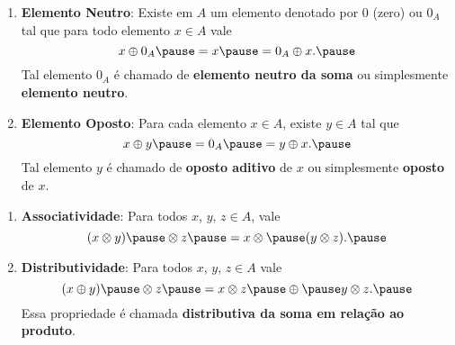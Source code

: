 \documentclass{beamer}
\begin{document}
    \begin{frame}
        \begin{definicao}
            \begin{enumerate}[label={\roman*})]
                \conti

                \item \textbf{Elemento Neutro}: \pause Existe em $A$ \pause um elemento denotado por $0$ \pause (zero)
                    ou $0_{A}$ \pause tal que para todo elemento $x \in A$ \pause vale\pause
                \[
                    x \oplus 0_A \pause = x \pause = 0_A \oplus x.\pause
                \]
                Tal elemento $0_A$ \pause \'e chamado de \textbf{elemento neutro da soma} \pause ou simplesmente
                \textbf{elemento neutro}.\pause

                \vspace{.7cm}

                \item \textbf{Elemento Oposto}: \pause Para cada elemento $x \in A$, \pause existe $y \in A$ \pause tal
                    que\pause
                \[
                    x \oplus y \pause = 0_A \pause = y \oplus x.\pause
                \]
                Tal elemento $y$ \pause \'e chamado de \textbf{oposto aditivo} \pause de $x$ \pause ou simplesmente
                \textbf{oposto} de $x$.

                \vspace{.7cm}

                \seti
            \end{enumerate}
        \end{definicao}
    \end{frame}

    \begin{frame}
        \begin{definicao}
            \begin{enumerate}[label={\roman*})]
                \conti

                \item \textbf{Associatividade}: \pause Para todos $x$, \pause $y$, \pause $z \in A$, \pause vale\pause
                \[
                    (x\otimes y) \pause \otimes z \pause = x \otimes \pause (y\otimes z).\pause
                \]

                \vspace{.7cm}

                \item \textbf{Distributividade}: \pause Para todos $x$, \pause $y$, \pause $z \in A$ \pause vale\pause
                \[
                    (x \oplus y) \pause \otimes z \pause = x \otimes z \pause \oplus \pause y\otimes z.\pause
                \]
                Essa propriedade {\'e} chamada \textbf{distributiva da soma em rela{\c c}{\~a}o ao produto}.

                \vspace{.7cm}

                \seti
            \end{enumerate}
        \end{definicao}
    \end{frame}
\end{document}
